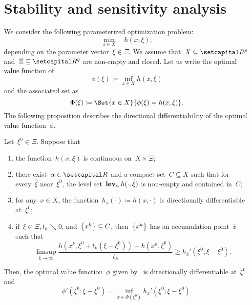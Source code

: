\documentclass[../main]{subfiles}
\begin{document}
\section{Stability and sensitivity analysis}
We consider the following parameterized optimization problem:
\begin{equation} \label{eq:parameterized}
    \min_{x \in X} \quad h(x, \xi)
    ,\end{equation}
depending on the parameter vector~$\xi \in \Xi$.
We assume that~$X \subseteq \setR^p$ and~$\Xi \subseteq \setR^q$ are non-empty and closed.
Let us write the optimal value function of~
\begin{equation} \label{eq:opt_val_fun}
    \phi(\xi) \coloneqq \inf_{x \in X} h(x, \xi)
\end{equation}
and the associated set as
\begin{equation} \label{eq:opt_sol_map}
    \Phi(\xi) \coloneqq \Set{x \in X}{\phi(\xi) = h(x, \xi)}
    .\end{equation}
The following proposition describes the directional differentiability of the optimal value function~$\phi$.
\begin{proposition} 
    Let~$\xi^0 \in \Xi$.
    Suppose that
    \begin{enumerate}
        \item the function~$h(x, \xi)$ is continuous on~$X \times \Xi$;
        \item there exist~$\alpha \in \setR$ and a compact set~$C \subseteq X$ such that for every~$\hat{\xi}$ near~$\xi^0$, the level set~$\level_\alpha h(\cdot, \hat{\xi})$ is non-empty and contained in~$C$;
        \item for any~$x \in X$, the function~$h_x(\cdot) \coloneqq h(x, \cdot)$ is directionally differentiable at~$\xi^0$;
        \item if~$\xi \in \Xi, t_k \searrow 0$, and~$\set*{x^k} \subseteq C$, then~$\set*{x^k}$ has an accumulation point~$\bar{x}$ such that
              \begin{equation}
                  \limsup_{k \to \infty} \frac{h(x^k, \xi^0 + t_k(\xi - \xi^0)) - h(x^k, \xi^0)}{t_k} \ge h_{\bar{x}}'(\xi^0; \xi - \xi^0)
                  .\end{equation}
    \end{enumerate}
    Then, the optimal value function~$\phi$ given by~ is directionally differentiable at~$\xi^0$ and
    \begin{equation}
        \phi'(\xi^0; \xi - \xi^0) = \inf_{x \in \Phi(\xi^0)} h_x'(\xi^0; \xi - \xi^0)
        .\end{equation}
\end{proposition}
\end{document}
